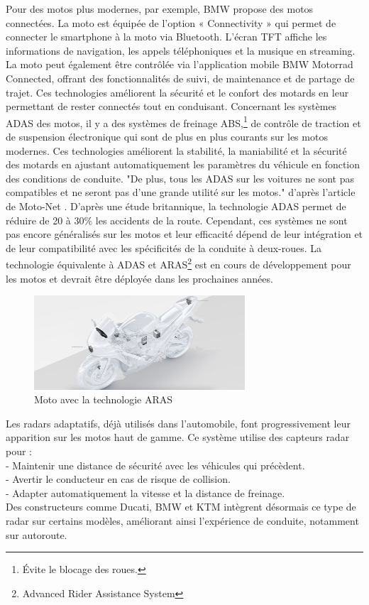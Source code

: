 \documentclass{article}
\begin{document}
Pour des motos plus modernes, par exemple, BMW propose des motos connectées\cite{bmw_adas}. La moto est équipée de l’option « Connectivity » qui permet de connecter le smartphone à la moto via Bluetooth. L’écran TFT affiche les informations de navigation, les appels téléphoniques et la musique en streaming. La moto peut également être contrôlée via l’application mobile BMW Motorrad Connected, offrant des fonctionnalités de suivi, de maintenance et de partage de trajet. Ces technologies améliorent la sécurité et le confort des motards en leur permettant de rester connectés tout en conduisant.
Concernant les systèmes ADAS des motos\cite{moto_adas}, il y a des systèmes de freinage ABS,\footnote{Évite le blocage des roues.} de contrôle de traction et de suspension électronique qui sont de plus en plus courants sur les motos modernes. Ces technologies améliorent la stabilité, la maniabilité et la sécurité des motards en ajustant automatiquement les paramètres du véhicule en fonction des conditions de conduite. "De plus, tous les ADAS sur les voitures ne sont pas compatibles et ne seront pas d’une grande utilité sur les motos." d'après l'article de Moto-Net \cite{moto_adas}.
D'après une étude britannique, la technologie ADAS permet de réduire de 20 à 30\%\cite{moto_aras} les accidents de la route. Cependant, ces systèmes ne sont pas encore généralisés sur les motos et leur efficacité dépend de leur intégration et de leur compatibilité avec les spécificités de la conduite à deux-roues. La technologie équivalente à ADAS et ARAS\footnote{Advanced Rider Assistance System} est en cours de développement pour les motos et devrait être déployée dans les prochaines années.

\begin{figure}[H]
    \centering
    \includegraphics[width=0.7\textwidth]{images/aras_moto.jpeg} 
    \caption{Moto avec la technologie ARAS}
\end{figure}

Les radars adaptatifs, déjà utilisés dans l’automobile, font progressivement leur apparition sur les motos haut de gamme. Ce système utilise des capteurs radar pour :\\
- Maintenir une distance de sécurité avec les véhicules qui précèdent.\\
- Avertir le conducteur en cas de risque de collision.\\
- Adapter automatiquement la vitesse et la distance de freinage.\\
Des constructeurs comme Ducati, BMW et KTM intègrent désormais ce type de radar sur certains modèles, améliorant ainsi l’expérience de conduite, notamment sur autoroute.
\end{document}
